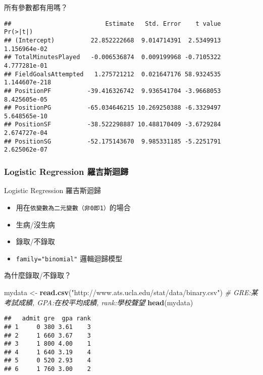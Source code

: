 \documentclass[]{book}
\newenvironment{Shaded}{\begin{snugshade}}{\end{snugshade}}
\newcommand{\KeywordTok}[1]{\textcolor[rgb]{0.13,0.29,0.53}{\textbf{{#1}}}}
\newcommand{\StringTok}[1]{\textcolor[rgb]{0.31,0.60,0.02}{{#1}}}
\newcommand{\CommentTok}[1]{\textcolor[rgb]{0.56,0.35,0.01}{\textit{{#1}}}}
\newcommand{\NormalTok}[1]{{#1}}
\providecommand{\tightlist}{%
  \setlength{\itemsep}{0pt}\setlength{\parskip}{0pt}}
\begin{document}
所有參數都有用嗎？

\begin{Shaded}
\end{Shaded}

\begin{verbatim}
##                          Estimate   Std. Error    t value      Pr(>|t|)
## (Intercept)          22.852222668  9.014714391  2.5349913  1.156964e-02
## TotalMinutesPlayed   -0.006536874  0.009199968 -0.7105322  4.777281e-01
## FieldGoalsAttempted   1.275721212  0.021647176 58.9324535 1.144607e-218
## PositionPF          -39.416326742  9.936541704 -3.9668053  8.425605e-05
## PositionPG          -65.034646215 10.269250388 -6.3329497  5.648565e-10
## PositionSF          -38.522298887 10.488170409 -3.6729284  2.674727e-04
## PositionSG          -52.175143670  9.985331185 -5.2251791  2.625062e-07
\end{verbatim}

\subsubsection{Logistic Regression
羅吉斯迴歸}\label{logistic-regression-}

Logistic Regression 羅吉斯迴歸

\begin{itemize}
\tightlist
\item
  用在\texttt{依變數為二元變數（非0即1）}的場合
\item
  生病/沒生病
\item
  錄取/不錄取
\item
  \texttt{family="binomial"} 邏輯迴歸模型
\end{itemize}

為什麼錄取/不錄取？

\begin{Shaded}
\begin{Highlighting}[]
\NormalTok{mydata <-}\StringTok{ }\KeywordTok{read.csv}\NormalTok{(}\StringTok{"http://www.ats.ucla.edu/stat/data/binary.csv"}\NormalTok{)}
\CommentTok{# GRE:某考試成績, GPA:在校平均成績, rank:學校聲望}
\KeywordTok{head}\NormalTok{(mydata)}
\end{Highlighting}
\end{Shaded}

\begin{verbatim}
##   admit gre  gpa rank
## 1     0 380 3.61    3
## 2     1 660 3.67    3
## 3     1 800 4.00    1
## 4     1 640 3.19    4
## 5     0 520 2.93    4
## 6     1 760 3.00    2
\end{verbatim}
\end{document}
